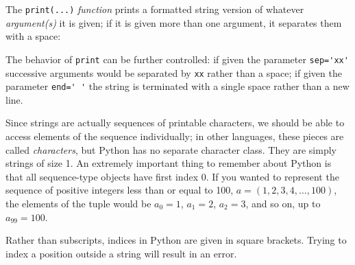 \documentclass[m3380-lec-main.tex]{subfiles}
\begin{document}
\smallskip\noindent
%
The \verb|print(...)| \emph{function} prints a formatted string version of whatever \emph{argument(s)} it is given; if it is given more than one argument, it separates them with a space:

\smallskip\noindent
The behavior of \verb|print| can be further controlled: if given the parameter \verb|sep='xx'| successive arguments would be separated by \verb|xx| rather than a space; if given the parameter \verb|end=' '| the string is terminated with a single space rather than a new line.

Since strings are actually sequences of printable characters, we should be able to access elements of the sequence individually; in other languages, these pieces are called \emph{characters}, but Python has no separate character class. They are simply strings of size 1. An extremely important thing to remember about Python is that all sequence-type objects have first index $0$. If you wanted to represent the sequence of positive integers less than or equal to 100,  $a=(1,2,3,4,\ldots, 100)$, the elements of the tuple would be $a_0=1$, $a_1=2$, $a_2=3$, and so on, up to $a_{99}=100$.

Rather than subscripts, indices in Python are given in square brackets. Trying to index a position outside a string will result in an error.

\smallskip\noindent
\end{document}
